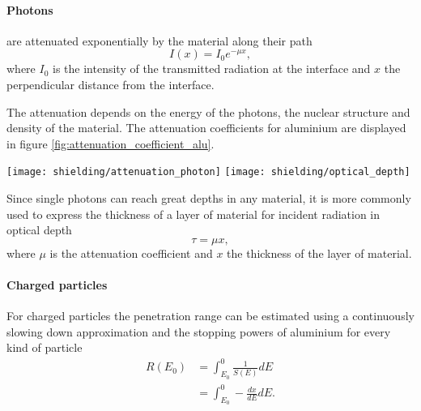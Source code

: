 \paragraph{Photons} are attenuated exponentially by the material along their path
\begin{equation*}
  I(x) = I_0 e^{-\mu x},
\end{equation*}
where $I_0$ is the intensity of the transmitted radiation at the interface and $x$ the perpendicular distance from the interface.

The attenuation depends on the energy of the photons, the nuclear structure and density of the material.
The attenuation coefficients for aluminium are displayed in figure \ref{fig:attenuation_coefficient_alu}.
\begin{figure*}
  \centering
  \texttt{[image: shielding/attenuation\_photon]}
  \texttt{[image: shielding/optical\_depth]}
  \caption{%
    The plot on the left displays the attenuation coefficient (blue) and energy absorption coefficient (orange) for photons in aluminium.
    The right plot displays the thickness of aluminium required to have an optical depth of one.
    Data used from NIST tables.
    Data source: \href{http://physics.nist.gov/PhysRefData/XrayMassCoef/tab3.html}{NIST Xray Mass Coefficients},
  }
  \label{fig:attenuation_coefficient_alu}
\end{figure*}

Since single photons can reach great depths in any material, it is more commonly used to express the thickness of a layer of material for incident radiation in optical depth
\begin{equation*}
  \tau = \mu x,
\end{equation*}
where $\mu$ is the attenuation coefficient and $x$ the thickness of the layer of material.


\paragraph{Charged particles} For charged particles the penetration range can be estimated using a continuously slowing down approximation and the stopping powers of aluminium for every kind of particle
\begin{align*}
  R(E_0) &= \int_{E_0}^{0} \frac{1}{S(E)} dE \\
         &= \int_{E_0}^{0} -\frac{dx}{dE} dE.
\end{align*}

